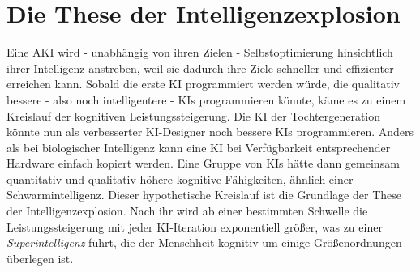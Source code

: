 \section{Die These der Intelligenzexplosion}
Eine AKI wird - unabhängig von ihren Zielen - Selbstoptimierung hinsichtlich ihrer Intelligenz anstreben, weil sie dadurch ihre Ziele schneller und effizienter erreichen kann. Sobald die erste KI programmiert werden würde, die qualitativ bessere - also noch intelligentere - KIs programmieren könnte, käme es zu einem Kreislauf der kognitiven Leistungssteigerung. Die KI der Tochtergeneration könnte nun als verbesserter KI-Designer noch bessere KIs programmieren. Anders als bei biologischer Intelligenz kann eine KI bei Verfügbarkeit entsprechender Hardware einfach kopiert werden. Eine Gruppe von KIs hätte dann gemeinsam quantitativ und qualitativ höhere kognitive Fähigkeiten, ähnlich einer Schwarmintelligenz. Dieser hypothetische Kreislauf ist die Grundlage der These der Intelligenzexplosion. Nach ihr wird ab einer bestimmten Schwelle die Leistungssteigerung mit jeder KI-Iteration exponentiell größer, was zu einer \emph{Superintelligenz} führt, die der Menschheit kognitiv um einige Größenordnungen überlegen ist. 

